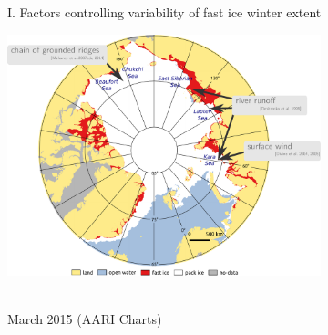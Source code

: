 \documentclass[8pt]{beamer}
\newcommand\Fontvi{\fontsize{6}{7.2}\selectfont}
\begin{document}
\setwatermark{\fontsize{125pt}{125pt}\selectfont{}}
\begin{frame}[fragile]{I. Factors controlling variability of fast ice winter extent}
	\begin{center}
		\includegraphics[height=7cm]{./img/ArcticSI_Mar2015_FI_know.pdf}\\
	\end{center}
	~\\
	\Fontvi
	17 March 2015 (AARI Charts)
\end{frame}
\end{document}
